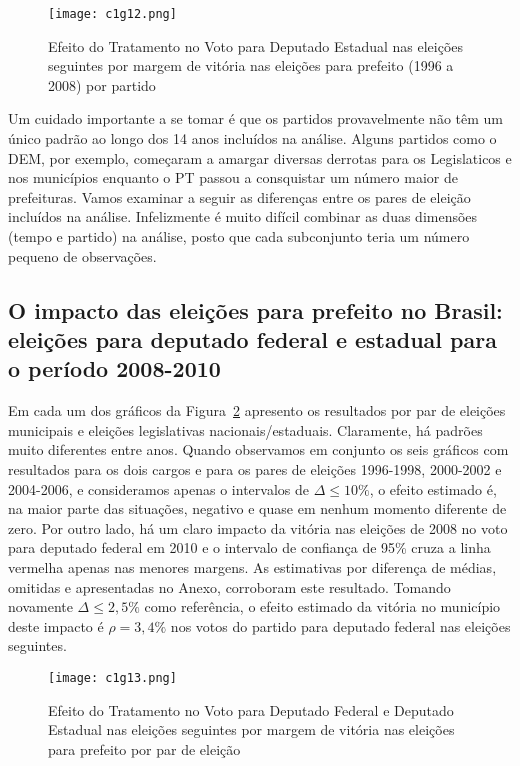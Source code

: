 \begin{figure}[htp]
	\centering
	\texttt{[image: c1g12.png]}
	\caption{Efeito do Tratamento no Voto para Deputado Estadual nas eleições seguintes por margem de vitória nas eleições para prefeito (1996 a 2008) por partido}
	\label{fig:c1g12} 
\end{figure}

Um cuidado importante a se tomar é que os partidos provavelmente não têm um único padrão ao longo dos 14 anos incluídos na análise. Alguns partidos como o DEM, por exemplo, começaram a amargar diversas derrotas para os Legislaticos e nos municípios enquanto o PT passou a consquistar um número maior de prefeituras. Vamos examinar a seguir as diferenças entre os pares de eleição incluídos na análise. Infelizmente é muito difícil combinar as duas dimensões (tempo e partido) na análise, posto que cada subconjunto teria um número pequeno de observações.

\subsection{O impacto das eleições para prefeito no Brasil: eleições para deputado federal e estadual para o período 2008-2010}

Em cada um dos gráficos da Figura~\ref{fig:c1g13} apresento os resultados por par de eleições municipais e eleições legislativas nacionais/estaduais. Claramente, há padrões muito diferentes entre anos. Quando observamos em conjunto os seis gráficos com resultados para os dois cargos e para os pares de eleições 1996-1998, 2000-2002 e 2004-2006, e consideramos apenas o intervalos de $\Delta \leq 10\%$, o efeito estimado é, na maior parte das situações, negativo e quase em nenhum momento diferente de zero. Por outro lado, há um claro impacto da vitória nas eleições de 2008 no voto para deputado federal em 2010 e o intervalo de confiança de 95\% cruza a linha vermelha apenas nas menores margens. As estimativas por diferença de médias, omitidas e apresentadas no Anexo, corroboram este resultado. Tomando novamente $\Delta \leq 2,5\%$ como referência, o efeito estimado da vitória no município deste impacto é $\rho=3,4\%$ nos votos do partido para deputado federal nas eleições seguintes.

\begin{figure}[htp]
	\centering
	\texttt{[image: c1g13.png]}
	\caption{Efeito do Tratamento no Voto para Deputado Federal e Deputado Estadual nas eleições seguintes por margem de vitória nas eleições para prefeito por par de eleição}
	\label{fig:c1g13} 
\end{figure}

